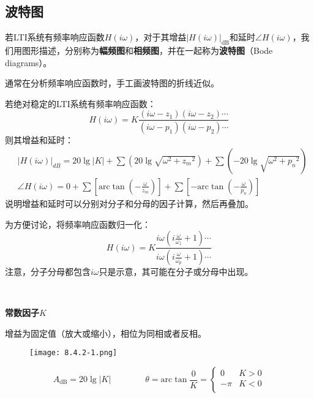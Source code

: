 \subsection{波特图}

若LTI系统有频率响应函数$H\left( i\omega \right) $，对于其增益$\left| H\left( i\omega \right) \right|_{\mathrm{dB}}$和延时$\angle H\left( i\omega \right) $，我们用图形描述，分别称为{\bf 幅频图}和{\bf 相频图}，并在一起称为{\bf 波特图}（Bode diagrams）。

\begin{tcolorbox}
通常在分析频率响应函数时，手工画波特图的折线近似。
\end{tcolorbox}

若绝对稳定的LTI系统有频率响应函数：
\[
H\left( i\omega \right) =K\frac{\left( i\omega -z_1 \right) \left( i\omega -z_2 \right) \cdots }{\left( i\omega -p_1 \right) \left( i\omega -p_2 \right) \cdots }
\]
则其增益和延时：
\begin{align*}
&\left| H\left( i\omega \right) \right|_{dB}=20\lg \left| K \right|+\sum{\left( 20\lg \sqrt{\omega ^2+{z_m}^2} \right)}+\sum{\left( -20\lg \sqrt{\omega ^2+{p_n}^2} \right)} \\
&\angle H\left( i\omega \right) =0+\sum{\left[ \mathrm{arc}\tan \left( -\frac{\omega}{z_m} \right) \right]}+\sum{\left[ -\mathrm{arc}\tan \left( -\frac{\omega}{p_n} \right) \right]}
\end{align*}
说明增益和延时可以分别对分子和分母的因子计算，然后再叠加。

为方便讨论，将频率响应函数归一化：
\[
H\left( i\omega \right) =K\frac{i\omega \left( i\frac{\omega}{\omega _z}+1 \right) \cdots}{i\omega \left( i\frac{\omega}{\omega _p}+1 \right) \cdots}
\]
注意，分子分母都包含$i\omega $只是示意，其可能在分子或分母中出现。

~

{\bf 常数因子$K$}

增益为固定值（放大或缩小），相位为同相或者反相。
\begin{figure}[h]
\centering
\texttt{[image: 8.4.2-1.png]}
\end{figure}
\[
A_{\mathrm{dB}}=20\lg \left| K \right| \qquad \qquad \theta =\mathrm{arc}\tan \frac{0}{K}=\begin{cases}
	0 &K>0\\
	-\pi &K<0\\
\end{cases}
\]

~

